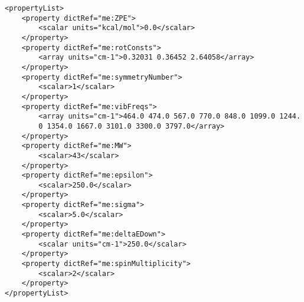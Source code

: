 {\footnotesize
\begin{verbatim}
<propertyList>
    <property dictRef="me:ZPE">
        <scalar units="kcal/mol">0.0</scalar>
    </property>
    <property dictRef="me:rotConsts">
        <array units="cm-1">0.32031 0.36452 2.64058</array>
    </property>
    <property dictRef="me:symmetryNumber">
        <scalar>1</scalar>
    </property>
    <property dictRef="me:vibFreqs">
        <array units="cm-1">464.0 474.0 567.0 770.0 848.0 1099.0 1244.
        0 1354.0 1667.0 3101.0 3300.0 3797.0</array>
    </property>
    <property dictRef="me:MW">
        <scalar>43</scalar>
    </property>
    <property dictRef="me:epsilon">
        <scalar>250.0</scalar>
    </property>
    <property dictRef="me:sigma">
        <scalar>5.0</scalar>
    </property>
    <property dictRef="me:deltaEDown">
        <scalar units="cm-1">250.0</scalar>
    </property>
    <property dictRef="me:spinMultiplicity">
        <scalar>2</scalar>
    </property>
</propertyList>
\end{verbatim}

}